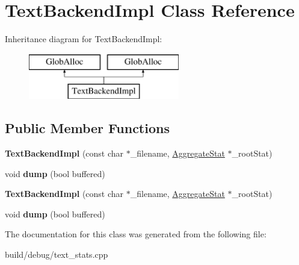 \hypertarget{classTextBackendImpl}{\section{Text\-Backend\-Impl Class Reference}
\label{classTextBackendImpl}
}
Inheritance diagram for Text\-Backend\-Impl\-:\begin{figure}[H]
\begin{center}
\leavevmode
\includegraphics[height=2.000000cm]{classTextBackendImpl}
\end{center}
\end{figure}
\subsection*{Public Member Functions}
\begin{DoxyCompactItemize}
\item 
\hypertarget{classTextBackendImpl_a24e7677f931bff32ffcf3bd7b2b342b8}{{\bfseries Text\-Backend\-Impl} (const char $\ast$\-\_\-filename, \hyperlink{classAggregateStat}{Aggregate\-Stat} $\ast$\-\_\-root\-Stat)}\label{classTextBackendImpl_a24e7677f931bff32ffcf3bd7b2b342b8}

\item 
\hypertarget{classTextBackendImpl_a5007cdf5ed29bb29b812508b95d4457d}{void {\bfseries dump} (bool buffered)}\label{classTextBackendImpl_a5007cdf5ed29bb29b812508b95d4457d}

\item 
\hypertarget{classTextBackendImpl_a24e7677f931bff32ffcf3bd7b2b342b8}{{\bfseries Text\-Backend\-Impl} (const char $\ast$\-\_\-filename, \hyperlink{classAggregateStat}{Aggregate\-Stat} $\ast$\-\_\-root\-Stat)}\label{classTextBackendImpl_a24e7677f931bff32ffcf3bd7b2b342b8}

\item 
\hypertarget{classTextBackendImpl_a5007cdf5ed29bb29b812508b95d4457d}{void {\bfseries dump} (bool buffered)}\label{classTextBackendImpl_a5007cdf5ed29bb29b812508b95d4457d}

\end{DoxyCompactItemize}


The documentation for this class was generated from the following file\-:\begin{DoxyCompactItemize}
\item 
build/debug/text\-\_\-stats.\-cpp\end{DoxyCompactItemize}

